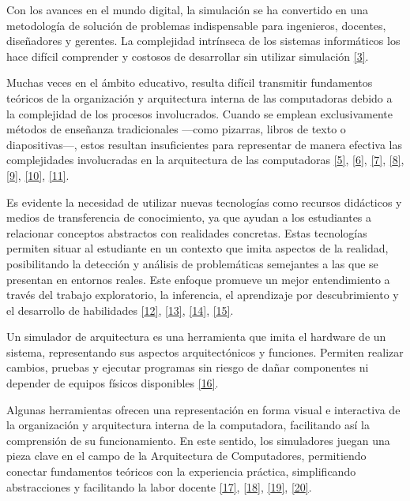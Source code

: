 \documentclass[12pt,oneside]{templates/unerthesis}
\begin{document}
Con los avances en el mundo digital, la simulación se ha convertido en una metodología de solución de problemas indispensable para ingenieros, docentes, diseñadores y gerentes. La complejidad intrínseca de los sistemas informáticos los hace difícil comprender y costosos de desarrollar sin utilizar simulación \protect\hyperlink{ref-law_simulation_2015}{{[}3{]}}.

Muchas veces en el ámbito educativo, resulta difícil transmitir fundamentos teóricos de la organización y arquitectura interna de las computadoras debido a la complejidad de los procesos involucrados. Cuando se emplean exclusivamente métodos de enseñanza tradicionales ---como pizarras, libros de texto o diapositivas---, estos resultan insuficientes para representar de manera efectiva las complejidades involucradas en la arquitectura de las computadoras \protect\hyperlink{ref-lion_simuladores_2005}{{[}5{]}}, \protect\hyperlink{ref-contreras_uso_2010}{{[}6{]}}, \protect\hyperlink{ref-garcia-garcia_pbbcache_2020}{{[}7{]}}, \protect\hyperlink{ref-grossi2005simulador}{{[}8{]}}, \protect\hyperlink{ref-herruzo2002desarrollo}{{[}9{]}}, \protect\hyperlink{ref-Martinez1994}{{[}10{]}}, \protect\hyperlink{ref-concheiro2005simula3ms}{{[}11{]}}.

Es evidente la necesidad de utilizar nuevas tecnologías como recursos didácticos y medios de transferencia de conocimiento, ya que ayudan a los estudiantes a relacionar conceptos abstractos con realidades concretas. Estas tecnologías permiten situar al estudiante en un contexto que imita aspectos de la realidad, posibilitando la detección y análisis de problemáticas semejantes a las que se presentan en entornos reales. Este enfoque promueve un mejor entendimiento a través del trabajo exploratorio, la inferencia, el aprendizaje por descubrimiento y el desarrollo de habilidades \protect\hyperlink{ref-nova_tool_2013}{{[}12{]}}, \protect\hyperlink{ref-mustafa_evaluating_2010}{{[}13{]}}, \protect\hyperlink{ref-garcia-carballeira_wepsim_2020}{{[}14{]}}, \protect\hyperlink{ref-prasad2016using}{{[}15{]}}.

Un simulador de arquitectura es una herramienta que imita el hardware de un sistema, representando sus aspectos arquitectónicos y funciones. Permiten realizar cambios, pruebas y ejecutar programas sin riesgo de dañar componentes ni depender de equipos físicos disponibles \protect\hyperlink{ref-radivojevic_design_2011}{{[}16{]}}.

Algunas herramientas ofrecen una representación en forma visual e interactiva de la organización y arquitectura interna de la computadora, facilitando así la comprensión de su funcionamiento. En este sentido, los simuladores juegan una pieza clave en el campo de la Arquitectura de Computadores, permitiendo conectar fundamentos teóricos con la experiencia práctica, simpliﬁcando abstracciones y facilitando la labor docente \protect\hyperlink{ref-nikolic_survey_2009}{{[}17{]}}, \protect\hyperlink{ref-hasan_survey_2012}{{[}18{]}}, \protect\hyperlink{ref-hennessy2017computer}{{[}19{]}}, \protect\hyperlink{ref-stallings_computer_2021}{{[}20{]}}.
\end{document}
